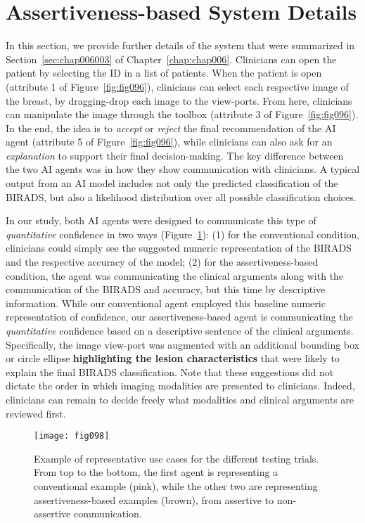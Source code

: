 \section{Assertiveness-based System Details}
\label{sec:app005004}

In this section, we provide further details of the system that were summarized in Section~\ref{sec:chap006003} of Chapter~\ref{chap:chap006}.
Clinicians can open the patient by selecting the ID in a list of patients.
When the patient is open (attribute 1 of Figure~\ref{fig:fig096}), clinicians can select each respective image of the breast, by dragging-drop each image to the view-ports.
From here, clinicians can manipulate the image through the toolbox (attribute 3 of Figure~\ref{fig:fig096}).
In the end, the idea is to {\it accept} or {\it reject} the final recommendation of the AI agent (attribute 5 of Figure~\ref{fig:fig096}), while clinicians can also ask for an {\it explanation} to support their final decision-making.
The key difference between the two AI agents was in how they show communication with clinicians.
A typical output from an AI model includes not only the predicted classification of the BIRADS, but also a likelihood distribution over all possible classification choices.

In our study, both AI agents were designed to communicate this type of {\it quantitative} confidence in two ways (Figure~\ref{fig:fig098}):
(1) for the conventional condition, clinicians could simply see the suggested numeric representation of the BIRADS and the respective accuracy of the model;
(2) for the assertiveness-based condition, the agent was communicating the clinical arguments along with the communication of the BIRADS and accuracy, but this time by descriptive information.
While our conventional agent employed this baseline numeric representation of confidence, our assertiveness-based agent is communicating the {\it quantitative} confidence based on a descriptive sentence of the clinical arguments.
Specifically, the image view-port was augmented with an additional bounding box or circle ellipse {\bf highlighting the lesion characteristics} that were likely to explain the final BIRADS classification.
Note that these suggestions did not dictate the order in which imaging modalities are presented to clinicians.
Indeed, clinicians can remain to decide freely what modalities and clinical arguments are reviewed first.

\begin{figure}[htpb]
\begin{center}
\centering
\texttt{[image: fig098]}
\end{center}
\caption[]{Example of representative use cases for the different testing trials. From top to the bottom, the first agent is representing a conventional example (pink), while the other two are representing assertiveness-based examples (brown), from assertive to non-assertive communication.}
\label{fig:fig098}
\end{figure}

